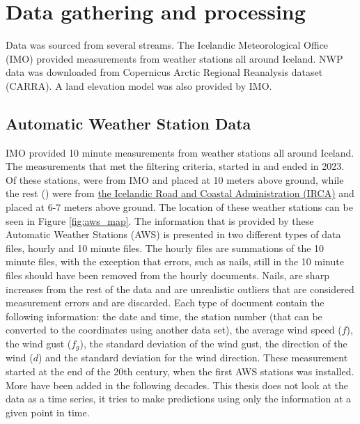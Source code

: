 
\chapter{Data gathering and processing}
\label{Chapter2}
Data was sourced from several streams. The Icelandic Meteorological Office (IMO) provided measurements from weather stations all around Iceland. NWP data was downloaded from Copernicus Arctic Regional Reanalysis dataset (CARRA). A land elevation model was also provided by IMO.

\section{Automatic Weather Station Data}

IMO provided 10 minute measurements from \nStationsMin weather stations all around Iceland. The measurements that met the filtering criteria, started in \startDateVedur and ended in 2023. Of these \nStationsMin stations, \nVedurMin were from IMO and placed at 10 meters above ground, while the rest (\nVGMin) were from \href{https://www.vegagerdin.is/}{the Icelandic Road and Coastal Administration (IRCA)} and placed at 6-7 meters above ground\cite{vegagerdin_postur}. The location of these weather stations can be seen in Figure \ref{fig:aws_map}. The information that is provided by these Automatic Weather Stations (AWS) is presented in two different types of data files, hourly and 10 minute files. The hourly files are summations of the 10 minute files, with the exception that errors, such as nails, still in the 10 minute files should have been removed from the hourly documents. Nails, are sharp increases from the rest of the data and are unrealistic outliers that are considered measurement errors and are discarded. Each type of document contain the following information: the date and time, the station number (that can be converted to the coordinates using another data set), the average wind speed ($f$), the wind gust ($f_g$), the standard deviation of the wind gust, the direction of the wind ($d$) and the standard deviation for the wind direction. These measurement started at the end of the 20th century, when the first AWS stations was installed. More have been added in the following decades. This thesis does not look at the data as a time series, it tries to make predictions using only the information at a given point in time.

